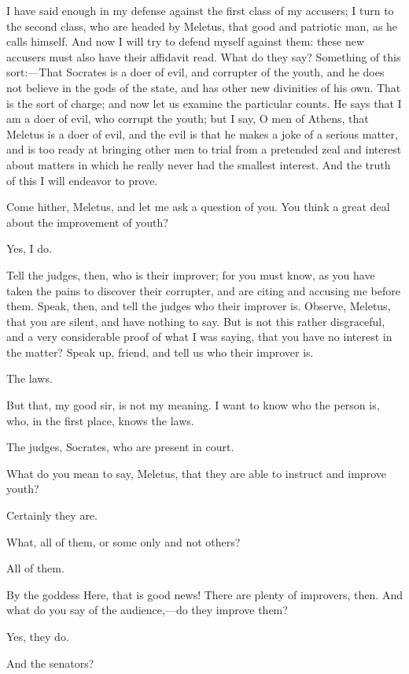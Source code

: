 \documentclass[12pt]{article}
\begin{document}
I have said enough in my defense against the first class of my accusers;
I turn to the second class, who are headed by Meletus, that good and
patriotic man, as he calls himself. And now I will try to defend myself
against them: these new accusers must also have their affidavit read.
What do they say? Something of this sort:---That Socrates is a doer
of evil, and corrupter of the youth, and he does not believe in the
gods of the state, and has other new divinities of his own. That is
the sort of charge; and now let us examine the particular counts.
He says that I am a doer of evil, who corrupt the youth; but I say,
O men of Athens, that Meletus is a doer of evil, and the evil is that
he makes a joke of a serious matter, and is too ready at bringing
other men to trial from a pretended zeal and interest about matters
in which he really never had the smallest interest. And the truth
of this I will endeavor to prove.

Come hither, Meletus, and let me ask a question of you. You think
a great deal about the improvement of youth?

Yes, I do.

Tell the judges, then, who is their improver; for you must know, as
you have taken the pains to discover their corrupter, and are citing
and accusing me before them. Speak, then, and tell the judges who
their improver is. Observe, Meletus, that you are silent, and have
nothing to say. But is not this rather disgraceful, and a very considerable
proof of what I was saying, that you have no interest in the matter?
Speak up, friend, and tell us who their improver is.

The laws.

But that, my good sir, is not my meaning. I want to know who the person
is, who, in the first place, knows the laws.

The judges, Socrates, who are present in court.

What do you mean to say, Meletus, that they are able to instruct and
improve youth?

Certainly they are.

What, all of them, or some only and not others?

All of them.

By the goddess Here, that is good news! There are plenty of improvers,
then. And what do you say of the audience,---do they improve them?

Yes, they do.

And the senators?
\end{document}
